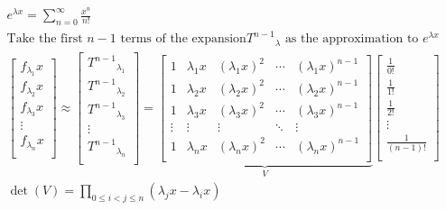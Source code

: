 \documentclass{article}
\begin{document}
\begin{equation*}
    \begin{split}
        &e^{\lambda x} = \sum^\infty_{n=0}\frac{x^n}{n!}\\
        &\text{Take the first }n-1 \text{ terms of the expansion}{T^{n-1}}_\lambda\text{ as the approximation to } e^{\lambda x}\\
        &\begin{bmatrix}
            f_{\lambda_{1}}x\\
            f_{\lambda_{2}}x\\
            f_{\lambda_{3}}x\\
            \vdots\\
            f_{\lambda_{n}}x\\
        \end{bmatrix}\approx \begin{bmatrix}
            {T^{n-1}}_{\lambda_1}\\
            {T^{n-1}}_{\lambda_2}\\
            {T^{n-1}}_{\lambda_3}\\
            \vdots\\
            {T^{n-1}}_{\lambda_n}\\
        \end{bmatrix}=\underbrace{\begin{bmatrix}
            1&\lambda_{1}x&(\lambda_{1}x)^2&\cdots&(\lambda_{1}x)^{n-1}\\
            1&\lambda_{2}x&(\lambda_{2}x)^2&\cdots&(\lambda_{2}x)^{n-1}\\
            1&\lambda_{3}x&(\lambda_{3}x)^2&\cdots&(\lambda_{3}x)^{n-1}\\
            \vdots &\vdots&\vdots&\ddots &\vdots \\
            1&\lambda_{n}x&(\lambda_{n}x)^2&\cdots&(\lambda_{n}x)^{n-1}\\
        \end{bmatrix}}_V\begin{bmatrix}
            \frac{1}{0!}\\
            \frac{1}{1!}\\
            \frac{1}{2!}\\
            \vdots\\
            \frac{1}{(n-1)!}\\
        \end{bmatrix}\\
        &\det(V)=\prod_{0\leqslant i<j\leqslant n}(\lambda_jx-\lambda_ix)\\

\end{split}
\end{equation*}
\end{document}
